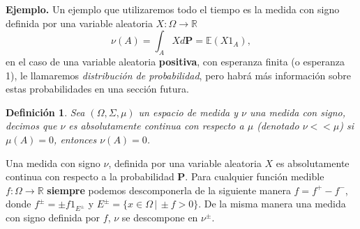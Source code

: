 \documentclass[letterpaper]{article}
\newtheorem{def.}{Definici\'on}[section]
\newcommand{\esp}{\mathbb E}
\newcommand{\eje}{{\newline \noindent \sc \textbf{Ejemplo. }}}
\newcommand{\om}{\ensuremath{\Omega}}
\newcommand{\sig}{\ensuremath{\Sigma}}
\newcommand{\re}{\ensuremath{\mathbb R }}
\begin{document}
\eje Un ejemplo que utilizaremos todo el tiempo es la medida con signo definida por una variable aleatoria \(X:\Omega\rightarrow\re\)
\[
    \nu(A)=\int_{A} X d\textbf{P}=\esp(X1_{A}),
\]
en el caso de una variable aleatoria \textbf{positiva}, con esperanza finita (o esperanza 1), le llamaremos \emph{distribución de probabilidad}, pero habrá más información sobre estas probabilidades en una sección futura.
\begin{def.}
Sea \((\om,\sig,\mu)\) un espacio de medida y \(\nu\) una medida con signo, decimos que \(\nu\) es absolutamente continua con respecto a \(\mu\) (denotado \(\nu<<\mu\)) si \(\mu(A)=0\), entonces \(\nu(A)=0\).
\end{def.}
\noindent Una medida con signo \(\nu\), definida por una variable aleatoria \(X\) es absolutamente continua con respecto a la probabilidad \textbf{P}. Para cualquier función medible \(f:\Omega\rightarrow\re\) \textbf{siempre} podemos descomponerla de la siguiente manera \(f=f^{+}-f^{-}\), donde \(f^{\pm}=\pm f 1_{E^{\pm}}\) y \(E^{\pm}=\{x\in\Omega\,\vert\,\pm f >0\}\). De la misma manera una medida con signo definida por \(f\), \(\nu\) se descompone en \(\nu^{\pm}\).
\end{document}
